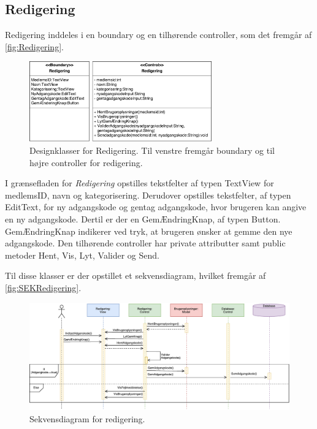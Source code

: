 \subsection*{Redigering}
Redigering inddeles i en boundary og en tilhørende controller, som det fremgår af \autoref{fig:Redigering}. 

\begin{figure} [H]
\centering
\includegraphics[width=0.7\textwidth]{figures/MVC/Redigering}
\caption{Designklasser for Redigering. Til venstre fremgår boundary og til højre controller for redigering.}
\label{fig:Redigering}
\end{figure}

\noindent
I grænsefladen for \textit{Redigering} opstilles tekstfelter af typen TextView for medlemsID, navn og kategorisering. Derudover opstilles tekstfelter, af typen EditText, for ny adgangskode og gentag adgangskode, hvor brugeren kan angive en ny adgangskode. Dertil er der en GemÆndringKnap, af typen Button. GemÆndringKnap indikerer ved tryk, at brugeren ønsker at gemme den nye adgangskode. 
Den tilhørende controller har private attributter samt public metoder Hent, Vis, Lyt, Valider og Send. 


 Til disse klasser er der opstillet et sekvensdiagram, hvilket fremgår af \autoref{fig:SEKRedigering}.


\begin{figure} [H]
\centering
\includegraphics[width=1\textwidth]{figures/Sek/SEKRedigering}
\caption{Sekvensdiagram for redigering.}
\label{fig:SEKRedigering}
\end{figure}


